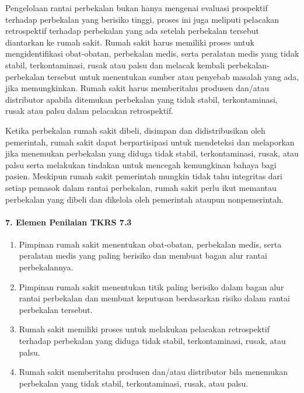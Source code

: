 \documentclass[
]{book}
\providecommand{\tightlist}{%
  \setlength{\itemsep}{0pt}\setlength{\parskip}{0pt}}
\begin{document}
Pengelolaan rantai perbekalan bukan hanya mengenai evaluasi prospektif terhadap perbekalan yang berisiko tinggi, proses ini juga meliputi pelacakan retrospektif terhadap perbekalan yang ada setelah perbekalan tersebut diantarkan ke rumah sakit. Rumah sakit harus memiliki proses untuk mengidentifikasi obat-obatan, perbekalan medis, serta peralatan medis yang tidak stabil, terkontaminasi, rusak atau palsu dan melacak kembali perbekalan-perbekalan tersebut untuk menentukan sumber atau penyebab masalah yang ada, jika memungkinkan. Rumah sakit harus memberitahu produsen dan/atau distributor apabila ditemukan perbekalan yang tidak stabil, terkontaminasi, rusak atau palsu dalam pelacakan retrospektif.

Ketika perbekalan rumah sakit dibeli, disimpan dan didistribusikan oleh pemerintah, rumah sakit dapat berpartisipasi untuk mendeteksi dan melaporkan jika menemukan perbekalan yang diduga tidak stabil, terkontaminasi, rusak, atau palsu serta melakukan tindakan untuk mencegah kemungkinan bahaya bagi pasien. Meskipun rumah sakit pemerintah mungkin tidak tahu integritas dari setiap pemasok dalam rantai perbekalan, rumah sakit perlu ikut memantau perbekalan yang dibeli dan dikelola oleh pemerintah ataupun nonpemerintah.

\hypertarget{elemen-penilaian-tkrs-7.3}{%
\paragraph*{7. Elemen Penilaian TKRS 7.3}\label{elemen-penilaian-tkrs-7.3}}

\begin{enumerate}
\def\labelenumi{\alph{enumi}.}
\tightlist
\item
  Pimpinan rumah sakit menentukan obat-obatan, perbekalan medis, serta peralatan medis yang paling berisiko dan membuat bagan alur rantai perbekalannya.
\item
  Pimpinan rumah sakit menentukan titik paling berisiko dalam bagan alur rantai perbekalan dan membuat keputusan berdasarkan risiko dalam rantai perbekalan tersebut.
\item
  Rumah sakit memiliki proses untuk melakukan pelacakan retrospektif terhadap perbekalan yang diduga tidak stabil, terkontaminasi, rusak, atau palsu.
\item
  Rumah sakit memberitahu produsen dan/atau distributor bila menemukan perbekalan yang tidak stabil, terkontaminasi, rusak, atau palsu.
\end{enumerate}
\end{document}
